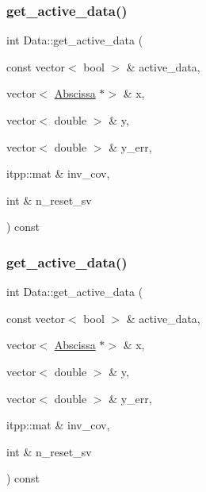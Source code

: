 \mbox{\label{classData_acde259686a74799b2fea4d1383d43ec4}} 
\subsubsection{\texorpdfstring{get\_active\_data()}{get\_active\_data()}\hspace{0.1cm}{\footnotesize\ttfamily [1/6]}}
{\footnotesize\ttfamily int Data\+::get\+\_\+active\+\_\+data (\begin{DoxyParamCaption}\item[{const vector$<$ bool $>$ \&}]{active\+\_\+data,  }\item[{vector$<$ \mbox{\hyperlink{classAbscissa}{Abscissa}} $\ast$$>$ \&}]{x,  }\item[{vector$<$ double $>$ \&}]{y,  }\item[{vector$<$ double $>$ \&}]{y\+\_\+err,  }\item[{itpp\+::mat \&}]{inv\+\_\+cov,  }\item[{int \&}]{n\+\_\+reset\+\_\+sv }\end{DoxyParamCaption}) const}

\mbox{\label{classData_acde259686a74799b2fea4d1383d43ec4}} 
\subsubsection{\texorpdfstring{get\_active\_data()}{get\_active\_data()}\hspace{0.1cm}{\footnotesize\ttfamily [2/6]}}
{\footnotesize\ttfamily int Data\+::get\+\_\+active\+\_\+data (\begin{DoxyParamCaption}\item[{const vector$<$ bool $>$ \&}]{active\+\_\+data,  }\item[{vector$<$ \mbox{\hyperlink{classAbscissa}{Abscissa}} $\ast$$>$ \&}]{x,  }\item[{vector$<$ double $>$ \&}]{y,  }\item[{vector$<$ double $>$ \&}]{y\+\_\+err,  }\item[{itpp\+::mat \&}]{inv\+\_\+cov,  }\item[{int \&}]{n\+\_\+reset\+\_\+sv }\end{DoxyParamCaption}) const}

